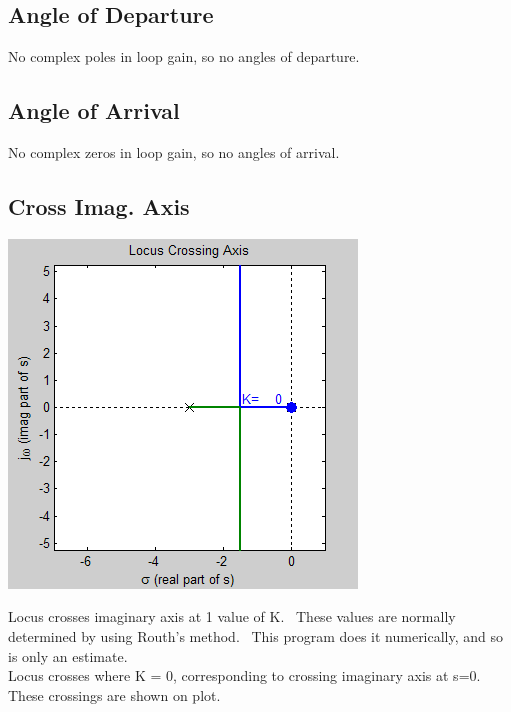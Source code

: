 \documentclass[16pt]{article}
\begin{document}
\subsection[Angle of
Departure]{\texorpdfstring{\protect\hypertarget{RuleDep}{}{}Angle of
Departure}{Angle of Departure}}\label{angle-of-departure}

No complex poles in loop gain, so no angles of departure.\\

\subsection[Angle of
Arrival]{\texorpdfstring{\protect\hypertarget{RuleArv}{}{}Angle of
Arrival}{Angle of Arrival}}\label{angle-of-arrival}

No complex zeros in loop gain, so no angles of arrival.\\

\subsection[Cross Imag.
Axis]{\texorpdfstring{\protect\hypertarget{RuleImag}{}{}Cross Imag.
Axis}{Cross Imag. Axis}}\label{cross-imag.-axis}

\includegraphics{./Root Locus_ Example 1_files/RLCrossImag.png}

Locus crosses imaginary axis at 1 value of K.~ These values are normally
determined by using Routh's method.~ This program does it numerically,
and so is only an estimate.\\[2\baselineskip]Locus crosses where K = 0,
corresponding to crossing imaginary axis at s=0.\\[2\baselineskip]These
crossings are shown on plot.\\
\end{document}
